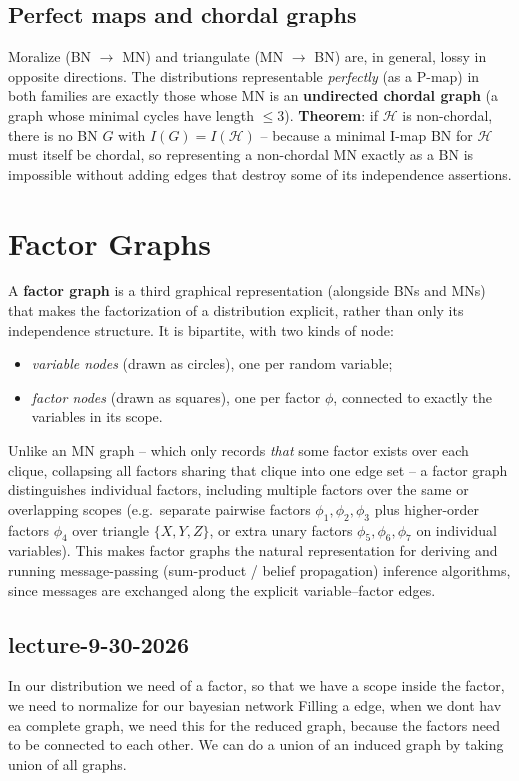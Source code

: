 \documentclass[11pt]{article}
\begin{document}
\subsection{Perfect maps and chordal graphs}

Moralize (BN $\to$ MN) and triangulate (MN $\to$ BN) are, in general, lossy
in opposite directions. The distributions representable \emph{perfectly}
(as a P-map) in both families are exactly those whose MN is an
\textbf{undirected chordal graph} (a graph whose minimal cycles have length
$\le 3$). \textbf{Theorem}: if $\mathcal{H}$ is non-chordal, there is no BN
$G$ with $I(G) = I(\mathcal{H})$ -- because a minimal I-map BN for
$\mathcal{H}$ must itself be chordal, so representing a non-chordal MN
exactly as a BN is impossible without adding edges that destroy some of its
independence assertions.

\section{Factor Graphs}

A \textbf{factor graph} is a third graphical representation (alongside BNs
and MNs) that makes the factorization of a distribution explicit, rather
than only its independence structure. It is bipartite, with two kinds of
node:

\begin{itemize}
  \item \emph{variable nodes} (drawn as circles), one per random variable;
  \item \emph{factor nodes} (drawn as squares), one per factor $\phi$,
    connected to exactly the variables in its scope.
\end{itemize}

Unlike an MN graph -- which only records \emph{that} some factor exists
over each clique, collapsing all factors sharing that clique into one edge
set -- a factor graph distinguishes individual factors, including multiple
factors over the same or overlapping scopes (e.g.\ separate pairwise
factors $\phi_1,\phi_2,\phi_3$ plus higher-order factors $\phi_4$ over
triangle $\{X,Y,Z\}$, or extra unary factors $\phi_5,\phi_6,\phi_7$ on
individual variables). This makes factor graphs the natural representation
for deriving and running message-passing (sum-product / belief
propagation) inference algorithms, since messages are exchanged along the
explicit variable--factor edges.

\subsection*{lecture-9-30-2026}
In our distribution we need of a factor, so that we have a scope inside the factor, we need to normalize for our bayesian network
Filling a edge, when we dont hav ea complete graph, we need this for the reduced graph, because the factors need to be connected to each other.
We can do a union of an induced graph by taking union of all graphs.
\end{document}
